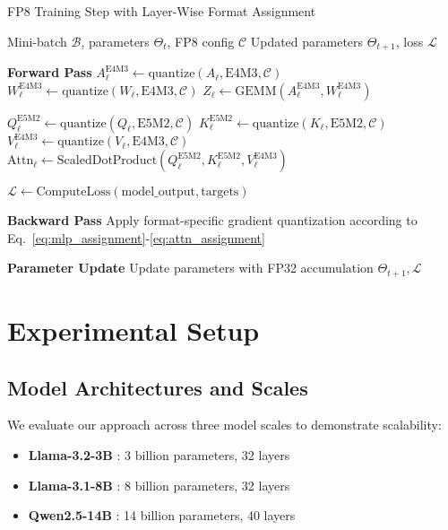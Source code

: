 \documentclass[conference]{IEEEtran}
\begin{document}
\begin{algorithm}[hbt!]
\caption{FP8 Training Step with Layer-Wise Format Assignment}
\label{alg:fp8_training}
\begin{algorithmic}
\Require Mini-batch $\mathcal{B}$, parameters $\Theta_t$, FP8 config $\mathcal{C}$
\Ensure Updated parameters $\Theta_{t+1}$, loss $\mathcal{L}$

\State \textbf{Forward Pass}
  \State $A_\ell^{\text{E4M3}} \gets \text{quantize}(A_{\ell}, \text{E4M3}, \mathcal{C})$
  \State $W_\ell^{\text{E4M3}} \gets \text{quantize}(W_{\ell}, \text{E4M3}, \mathcal{C})$
  \State $Z_\ell \gets \text{GEMM}(A_\ell^{\text{E4M3}}, W_\ell^{\text{E4M3}})$
\EndFor

  \State $Q_\ell^{\text{E5M2}} \gets \text{quantize}(Q_{\ell}, \text{E5M2}, \mathcal{C})$
  \State $K_\ell^{\text{E5M2}} \gets \text{quantize}(K_{\ell}, \text{E5M2}, \mathcal{C})$
  \State $V_\ell^{\text{E4M3}} \gets \text{quantize}(V_{\ell}, \text{E4M3}, \mathcal{C})$
  \State $\text{Attn}_\ell \gets \text{ScaledDotProduct}(Q_\ell^{\text{E5M2}}, K_\ell^{\text{E5M2}}, V_\ell^{\text{E4M3}})$
\EndFor

\State $\mathcal{L} \gets \text{ComputeLoss}(\text{model\_output}, \text{targets})$

\State \textbf{Backward Pass}
\State Apply format-specific gradient quantization according to Eq.~\ref{eq:mlp_assignment}-\ref{eq:attn_assignment}

\State \textbf{Parameter Update}
\State Update parameters with FP32 accumulation
\State \Return $\Theta_{t+1}, \mathcal{L}$
\end{algorithmic}
\end{algorithm}

\section{Experimental Setup}

\subsection{Model Architectures and Scales}

We evaluate our approach across three model scales to demonstrate scalability:

\begin{itemize}
\item \textbf{Llama-3.2-3B} \cite{meta2024llama3.2}: 3 billion parameters, 32 layers
\item \textbf{Llama-3.1-8B} \cite{meta2024llama3.1}: 8 billion parameters, 32 layers  
\item \textbf{Qwen2.5-14B} \cite{qwen2024}: 14 billion parameters, 40 layers
\end{itemize}
\end{document}
